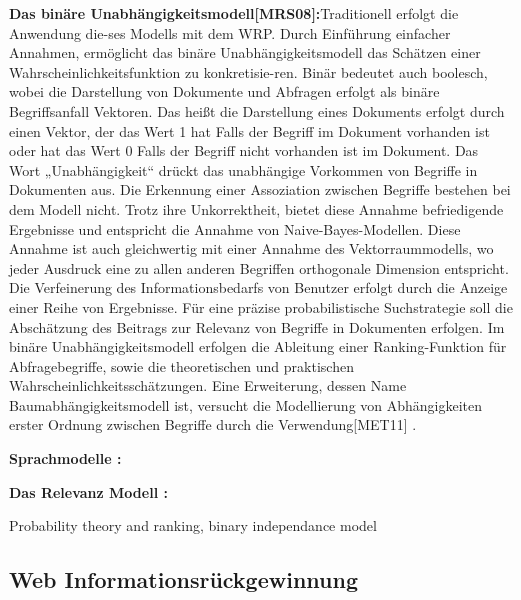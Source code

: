 \begin{itemize}
\textbf{Das binäre Unabhängigkeitsmodell[MRS08]:}Traditionell erfolgt die Anwendung die-ses Modells mit dem WRP. Durch Einführung einfacher Annahmen, ermöglicht das binäre Unabhängigkeitsmodell das Schätzen einer Wahrscheinlichkeitsfunktion zu konkretisie-ren. Binär bedeutet auch boolesch, wobei die Darstellung von Dokumente und Abfragen erfolgt als binäre Begriffsanfall Vektoren. Das heißt die Darstellung eines Dokuments erfolgt durch einen Vektor, der das Wert 1 hat Falls der Begriff im Dokument vorhanden ist oder hat das Wert 0 Falls der Begriff nicht vorhanden ist im Dokument. Das Wort „Unabhängigkeit“ drückt das unabhängige Vorkommen von Begriffe in Dokumenten aus. Die Erkennung einer Assoziation zwischen Begriffe bestehen bei dem Modell nicht. Trotz ihre Unkorrektheit, bietet diese Annahme befriedigende Ergebnisse und entspricht die Annahme von Naive-Bayes-Modellen. Diese Annahme ist auch gleichwertig mit einer Annahme des Vektorraummodells, wo jeder Ausdruck eine zu allen anderen Begriffen orthogonale Dimension entspricht. Die Verfeinerung des Informationsbedarfs von Benutzer erfolgt durch die Anzeige einer Reihe von Ergebnisse. Für eine präzise probabilistische Suchstrategie soll die Abschätzung des Beitrags zur Relevanz von Begriffe in Dokumenten erfolgen. Im binäre Unabhängigkeitsmodell erfolgen die Ableitung einer Ranking-Funktion für Abfragebegriffe, sowie die theoretischen und praktischen Wahrscheinlichkeitsschätzungen. Eine Erweiterung, dessen Name Baumabhängigkeitsmodell ist, versucht die Modellierung von Abhängigkeiten erster Ordnung zwischen Begriffe durch die Verwendung[MET11] .

\textbf{Sprachmodelle \cite{MEL15}:}

\textbf{Das Relevanz Modell \cite{MEL15}:}


Probability theory and ranking, binary independance model


\end{itemize}

\subsection{Web Informationsrückgewinnung}
\label{subsec: WebIR}


